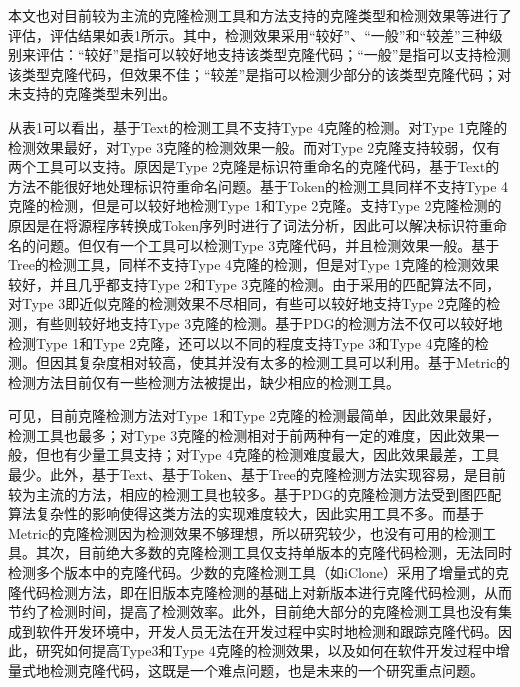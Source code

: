 本文也对目前较为主流的克隆检测工具和方法支持的克隆类型和检测效果等进行了评估，评估结果如表1所示。其中，检测效果采用“较好”、“一般”和“较差”三种级别来评估：“较好”是指可以较好地支持该类型克隆代码；“一般”是指可以支持检测该类型克隆代码，但效果不佳；“较差”是指可以检测少部分的该类型克隆代码；对未支持的克隆类型未列出。

从表1可以看出，基于Text的检测工具不支持Type 4克隆的检测。对Type 1克隆的检测效果最好，对Type 3克隆的检测效果一般。而对Type 2克隆支持较弱，仅有两个工具可以支持。原因是Type 2克隆是标识符重命名的克隆代码，基于Text的方法不能很好地处理标识符重命名问题。基于Token的检测工具同样不支持Type 4克隆的检测，但是可以较好地检测Type 1和Type 2克隆。支持Type 2克隆检测的原因是在将源程序转换成Token序列时进行了词法分析，因此可以解决标识符重命名的问题。但仅有一个工具可以检测Type 3克隆代码，并且检测效果一般。基于Tree的检测工具，同样不支持Type 4克隆的检测，但是对Type 1克隆的检测效果较好，并且几乎都支持Type 2和Type 3克隆的检测。由于采用的匹配算法不同，对Type 3即近似克隆的检测效果不尽相同，有些可以较好地支持Type 2克隆的检测，有些则较好地支持Type 3克隆的检测。基于PDG的检测方法不仅可以较好地检测Type 1和Type 2克隆，还可以以不同的程度支持Type 3和Type 4克隆的检测。但因其复杂度相对较高，使其并没有太多的检测工具可以利用。基于Metric的检测方法目前仅有一些检测方法被提出\cite{kontogiannis1996pattern}\cite{mayrand1996experiment}，缺少相应的检测工具。

可见，目前克隆检测方法对Type 1和Type 2克隆的检测最简单，因此效果最好，检测工具也最多；对Type 3克隆的检测相对于前两种有一定的难度，因此效果一般，但也有少量工具支持；对Type 4克隆的检测难度最大，因此效果最差，工具最少。此外，基于Text、基于Token、基于Tree的克隆检测方法实现容易，是目前较为主流的方法，相应的检测工具也较多。基于PDG的克隆检测方法受到图匹配算法复杂性的影响使得这类方法的实现难度较大，因此实用工具不多。而基于Metric的克隆检测因为检测效果不够理想，所以研究较少，也没有可用的检测工具。其次，目前绝大多数的克隆检测工具仅支持单版本的克隆代码检测，无法同时检测多个版本中的克隆代码。少数的克隆检测工具（如iClone）采用了增量式的克隆代码检测方法，即在旧版本克隆检测的基础上对新版本进行克隆代码检测，从而节约了检测时间，提高了检测效率。此外，目前绝大部分的克隆检测工具也没有集成到软件开发环境中，开发人员无法在开发过程中实时地检测和跟踪克隆代码。因此，研究如何提高Type3和Type 4克隆的检测效果，以及如何在软件开发过程中增量式地检测克隆代码，这既是一个难点问题，也是未来的一个研究重点问题。


